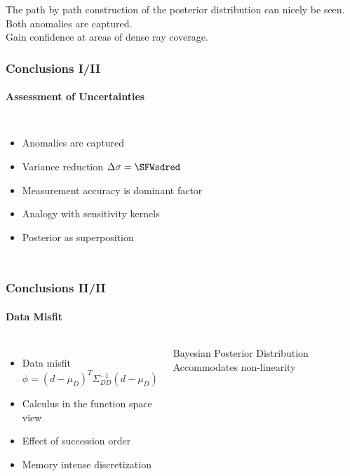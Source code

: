 \documentclass[aspectratio=169, t, 10pt, ]{beamer}
\begin{document}
The path by path construction of the posterior distribution can nicely be seen.
\\
Both anomalies are captured.
\\
Gain confidence at areas of dense ray coverage.


\begin{frame}
    \frametitle{Conclusions \phantom{I}I/II}
    \framesubtitle{Assessment of Uncertainties}

\begin{columns}
%

    \begin{itemize}
        \item Anomalies are captured
        \item Variance reduction $\Delta\sigma = \SFWsdred$
        \item Measurement accuracy is dominant factor
        \item Analogy with sensitivity kernels
        \item Posterior as superposition
    \end{itemize}

    \vspace{-10mm}

\end{columns}

\end{frame}


\begin{frame}
    \frametitle{Conclusions II/II}
    \framesubtitle{Data Misfit }

\begin{columns}
%
    \begin{itemize}
        \item Data misfit
            \begin{equation}
                \phi = (d-\mu_D)^T \Sigma_{DD}^{-1} (d-\mu_D)
            \end{equation}
        \item Calculus in the function space view
        \item Effect of succession order
        \item Memory intense discretization
    \end{itemize}

    \begin{exampleblock}{Bayesian Posterior Distribution}
        Accommodates non-linearity
    \end{exampleblock}

    \vspace{-10mm}
    
\end{columns}

\end{frame}
\end{document}
